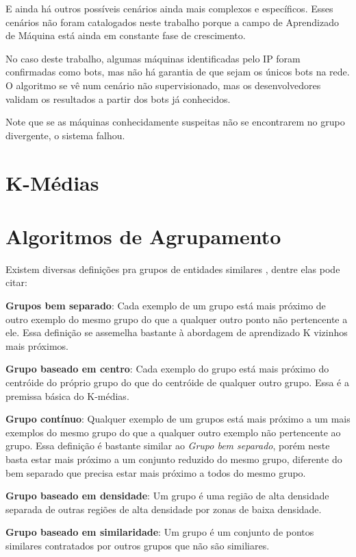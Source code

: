 E ainda há outros possíveis cenários ainda mais complexos e específicos. Esses cenários não foram catalogados neste trabalho porque a campo de Aprendizado de Máquina está ainda em constante fase de crescimento.

No caso deste trabalho, algumas máquinas identificadas pelo IP foram confirmadas como bots, mas não há garantia de que sejam os únicos bots na rede. O algoritmo se vê num cenário não supervisionado, mas os desenvolvedores validam os resultados a partir dos bots já conhecidos.

Note que se as máquinas conhecidamente suspeitas não se encontrarem no grupo divergente, o sistema falhou.

\section{K-Médias}
\section{Algoritmos de Agrupamento}

Existem diversas definições pra grupos de entidades similares \citep{faceli2011inteligencia}, dentre elas pode citar:
\begin{description}
\item \textbf{Grupos bem separado}: Cada exemplo de um grupo está mais próximo de outro exemplo do mesmo grupo do que a qualquer outro ponto não pertencente a ele. Essa definição se assemelha bastante à abordagem de aprendizado K vizinhos mais próximos.
\item \textbf{Grupo baseado em centro}: Cada exemplo do grupo está mais próximo do centróide do próprio grupo do que do centróide de qualquer outro grupo. Essa é a premissa básica do K-médias.
\item \textbf{Grupo contínuo}: Qualquer exemplo de um grupos está mais próximo a um mais exemplos do mesmo grupo do que a qualquer outro exemplo não pertencente ao grupo. Essa definição é bastante similar ao \textit{Grupo bem separado}, porém neste basta estar mais próximo a um conjunto reduzido do mesmo grupo, diferente do bem separado que precisa estar mais próximo a todos do mesmo grupo.
\item \textbf{Grupo baseado em densidade}: Um grupo é uma região de alta densidade separada de outras regiões de alta densidade por zonas de baixa densidade.
\item \textbf{Grupo baseado em similaridade}: Um grupo é um conjunto de pontos similares contratados por outros grupos que não são similiares.
\end{description}

